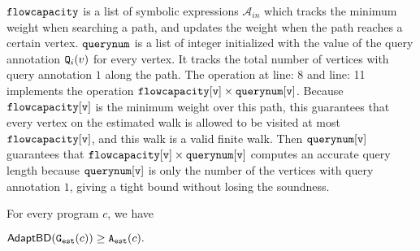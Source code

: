  
$\mathtt{flowcapacity}$ is a list of symbolic expressions $\mathcal{A}_{in}$ which tracks the minimum weight
when searching a path,
and updates the weight when the path reaches a certain vertex.
%
$\mathtt{querynum}$ is a list of integer
initialized with the value of the query annotation $\mathtt{Q}_i(v)$ for every vertex. 
It tracks the total number of vertices with query annotation $1$
along the path.
%
The operation
at line: 8 and line: 11 implements the operation  $\mathtt{flowcapacity[v] \times querynum[v]}$.
Because $\mathtt{flowcapacity[v]}$ is the minimum weight over this path,
this guarantees that every vertex on the estimated walk is allowed to be visited at most $\mathtt{flowcapacity[v]}$, and this walk is a valid finite walk.
Then $\mathtt{querynum[v]}$ guarantees that $\mathtt{flowcapacity[v] \times querynum[v]}$ computes an accurate query length
because $\mathtt{querynum[v]}$ is only the number of the vertices with query annotation $1$,
giving a tight bound without losing the soundness.

\begin{thm}
    \label{thm:adaptalg_soundness}
    For every program $c$, we have
\begin{center}
$
\mathsf{AdaptBD}(\mathtt{{G_{est}}}({c})) \geq {\ensuremath{\mathtt{A_{est}}}}(c).
$
\end{center}
\end{thm}



